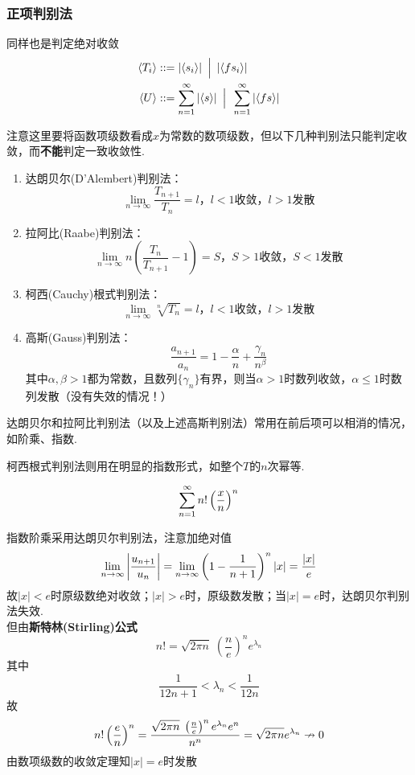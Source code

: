 \subsubsection{正项判别法}
同样也是判定绝对收敛
\[\begin{aligned}
\langle T_i\rangle&::=|\langle s_i\rangle| \enspace\Big|\enspace |\langle fs_i\rangle|\\
\langle U\rangle&::=\displaystyle\sum_{n=1}^{\infty}|\langle s\rangle|\enspace\Big|\enspace \displaystyle\sum_{n=1}^{\infty}|\langle fs\rangle|
\end{aligned}\]
\par 注意这里要将函数项级数看成$x$为常数的数项级数，但以下几种判别法只能判定收敛，而\textbf{不能}判定一致收敛性.
\begin{enumerate}
	\item 达朗贝尔(D'Alembert)判别法：
	\[\mbox{$\displaystyle\lim_{n\to\infty}\dfrac{T_{n+1}}{T_n}=l$，$l<1$收敛，$l>1$发散}\]
	\item 拉阿比(Raabe)判别法：
	\[\mbox{$\displaystyle\lim_{n\to\infty}n\left(\dfrac{T_n}{T_{n+1}}-1\right)=S$，$S>1$收敛，$S<1$发散}\]
	\item 柯西(Cauchy)根式判别法：
	\[\mbox{$\displaystyle\lim_{n\to\infty}\sqrt[n]{T_n}=l$，$l<1$收敛，$l>1$发散}\]
	\item 高斯(Gauss)判别法：
	\[\dfrac{a_{n+1}}{a_n}=1-\dfrac{\alpha}{n}+\dfrac{\gamma_n}{n^\beta}\]
	其中$\alpha,\beta>1$都为常数，且数列$\{\gamma_n\}$有界，则当$\alpha>1$时数列收敛，$\alpha\leq 1$时数列发散（没有失效的情况！）
\end{enumerate}
\par 达朗贝尔和拉阿比判别法（以及上述高斯判别法）常用在前后项可以相消的情况，如阶乘、指数.
\par 柯西根式判别法则用在明显的指数形式，如整个$T$的$n$次幂等.
\begin{example}
\[\displaystyle\sum_{n=1}^{\infty}n!\left(\dfrac{x}{n}\right)^n\]
\end{example}
\begin{analysis}
指数阶乘采用达朗贝尔判别法，注意加绝对值
\[\displaystyle\lim_{n\to\infty}\left|\dfrac{u_{n+1}}{u_n}\right|=\displaystyle\lim_{n\to\infty}\left(1-\dfrac{1}{n+1}\right)^n|x|=\dfrac{|x|}{e}\]
故$|x|<e$时原级数绝对收敛；$|x|>e$时，原级数发散；当$|x|=e$时，达朗贝尔判别法失效.\\
但由\textbf{斯特林(Stirling)公式}
\[n! = \sqrt{2 \pi n} \; \left(\frac{n}{e}\right)^{n}e^{\lambda_n}\]
其中
\[\displaystyle {\frac {1}{12n+1}}<\lambda _{n}<{\frac {1}{12n}}\]
故
\[n!\left(\dfrac{e}{n}\right)^n=\dfrac{\sqrt{2 \pi n} \; \left(\frac{n}{e}\right)^{n}e^{\lambda_n}e^n}{n^n}=\sqrt{2 \pi n} e^{\lambda_n}\nrightarrow 0\]
由数项级数的收敛定理知$|x|=e$时发散
\end{analysis}
